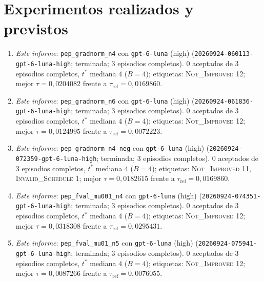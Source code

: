 \documentclass[11pt,a4paper]{article}
\begin{document}
\section{Experimentos realizados y previstos}

{\raggedright
\begin{enumerate}
  \item \emph{Este informe}: \texttt{pep\_\allowbreak{}gradnorm\_\allowbreak{}n4} con \texttt{gpt-\allowbreak{}6-\allowbreak{}luna} (high) (\texttt{20260924-\allowbreak{}060113-\allowbreak{}gpt-\allowbreak{}6-\allowbreak{}luna-\allowbreak{}high}; terminada; 3 episodios completos). 0 aceptados de 3 episodios completos, $t^*$ mediana $4$ ($B = 4$); etiquetas: \textsc{Not\_Improved} 12; mejor $\tau = 0{,}0204082$ frente a $\tau_{\mathrm{ref}} = 0{,}0169860$.
  \item \emph{Este informe}: \texttt{pep\_\allowbreak{}gradnorm\_\allowbreak{}n6} con \texttt{gpt-\allowbreak{}6-\allowbreak{}luna} (high) (\texttt{20260924-\allowbreak{}061836-\allowbreak{}gpt-\allowbreak{}6-\allowbreak{}luna-\allowbreak{}high}; terminada; 3 episodios completos). 0 aceptados de 3 episodios completos, $t^*$ mediana $4$ ($B = 4$); etiquetas: \textsc{Not\_Improved} 12; mejor $\tau = 0{,}0124995$ frente a $\tau_{\mathrm{ref}} = 0{,}0072223$.
  \item \emph{Este informe}: \texttt{pep\_\allowbreak{}gradnorm\_\allowbreak{}n4\_\allowbreak{}neg} con \texttt{gpt-\allowbreak{}6-\allowbreak{}luna} (high) (\texttt{20260924-\allowbreak{}072359-\allowbreak{}gpt-\allowbreak{}6-\allowbreak{}luna-\allowbreak{}high}; terminada; 3 episodios completos). 0 aceptados de 3 episodios completos, $t^*$ mediana $4$ ($B = 4$); etiquetas: \textsc{Not\_Improved} 11, \textsc{Invalid\_Schedule} 1; mejor $\tau = 0{,}0182615$ frente a $\tau_{\mathrm{ref}} = 0{,}0169860$.
  \item \emph{Este informe}: \texttt{pep\_\allowbreak{}fval\_\allowbreak{}mu001\_\allowbreak{}n4} con \texttt{gpt-\allowbreak{}6-\allowbreak{}luna} (high) (\texttt{20260924-\allowbreak{}074351-\allowbreak{}gpt-\allowbreak{}6-\allowbreak{}luna-\allowbreak{}high}; terminada; 3 episodios completos). 0 aceptados de 3 episodios completos, $t^*$ mediana $4$ ($B = 4$); etiquetas: \textsc{Not\_Improved} 12; mejor $\tau = 0{,}0318308$ frente a $\tau_{\mathrm{ref}} = 0{,}0295431$.
  \item \emph{Este informe}: \texttt{pep\_\allowbreak{}fval\_\allowbreak{}mu01\_\allowbreak{}n5} con \texttt{gpt-\allowbreak{}6-\allowbreak{}luna} (high) (\texttt{20260924-\allowbreak{}075941-\allowbreak{}gpt-\allowbreak{}6-\allowbreak{}luna-\allowbreak{}high}; terminada; 3 episodios completos). 0 aceptados de 3 episodios completos, $t^*$ mediana $4$ ($B = 4$); etiquetas: \textsc{Not\_Improved} 12; mejor $\tau = 0{,}0087266$ frente a $\tau_{\mathrm{ref}} = 0{,}0076055$.

\end{enumerate}}
\end{document}

